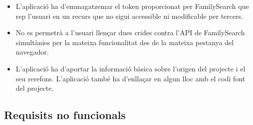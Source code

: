 \begin{itemize}
        \item L'aplicació ha d'emmagatzemar el token proporcionat per FamilySearch que rep l'usuari en un recurs que no sigui accessible ni modificable per tercers.
        \item No es permetrà a l'usuari llençar dues crides contra l’API de FamilySearch simultànies per la mateixa funcionalitat des de la mateixa pestanya del navegador.
        \item L’aplicació ha d'aportar la informació bàsica sobre l’origen del projecte i el seu rerefons. L'aplicació també ha d’enllaçar en algun lloc amb el codi font del projecte.
    \end{itemize}


    \subsection{Requisits no funcionals}

